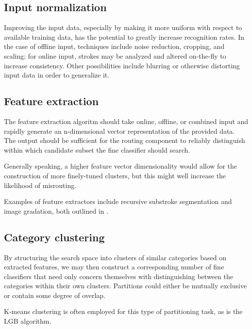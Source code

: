 \documentclass[10pt,conference,a4paper]{IEEEtran}
\begin{document}
	
	\subsection{Input normalization}

	Improving the input data, especially by making it more uniform with respect to available training data, has the potential
	to greatly increase recognition rates. In the case of offline input, techniques include noise reduction,
	cropping, and scaling; for online input, strokes may be analyzed and altered on-the-fly to increase consistency.
	Other possibilities include blurring or otherwise distorting input data in order to generalize it. \cite{razzak2009combining}



	\subsection{Feature extraction}

	The feature extraction algoritm should take online, offline, or combined input and rapidly generate
	an n-dimensional vector representation of the provided data. The output should be sufficient for the
	routing component to reliably distinguish within which candidate subset the fine classifier should search.

	Generally speaking, a higher feature vector dimensionality would allow for the construction of more finely-tuned clusters,
	but this might well increase the likelihood of misrouting.%

	Examples of feature extractors include recursive substroke segmentation and image gradation, both outlined in \cite{tanaka1999hybrid}.



	\subsection{Category clustering}

	By structuring the search space into clusters of similar categories based on extracted features, we may
	then construct a corresponding number of fine classifiers that need only concern themselves with distinguishing
	between the categories within their own clusters. Partitions could either be mutually exclusive or contain some degree of overlap.

	K-means clustering is often employed for this type of partitioning task, as is the LGB algorithm. \cite{yang2003accelerating}
\end{document}
